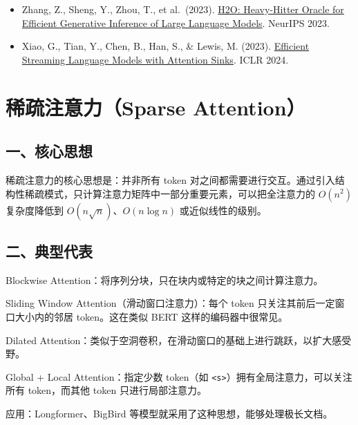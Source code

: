 \begin{itemize}
\tightlist
\item
  Zhang, Z., Sheng, Y., Zhou, T., et al.~(2023). \href{https://arxiv.org/abs/2306.14048}{H2O: Heavy-Hitter Oracle for Efficient Generative Inference of Large Language Models}. NeurIPS 2023.
\item
  Xiao, G., Tian, Y., Chen, B., Han, S., \& Lewis, M. (2023). \href{https://arxiv.org/abs/2309.17453}{Efficient Streaming Language Models with Attention Sinks}. ICLR 2024.
\end{itemize}

\clearpage

\hypertarget{ux7a00ux758fux6ce8ux610fux529bsparse-attention}{%
\section{稀疏注意力（Sparse Attention）}\label{ux7a00ux758fux6ce8ux610fux529bsparse-attention}}

\hypertarget{ux4e00ux6838ux5fc3ux601dux60f3-8}{%
\subsection{一、核心思想}\label{ux4e00ux6838ux5fc3ux601dux60f3-8}}

稀疏注意力的核心思想是：并非所有 token 对之间都需要进行交互。通过引入结构性稀疏模式，只计算注意力矩阵中一部分重要元素，可以把全注意力的 \(O(n^2)\) 复杂度降低到 \(O(n\sqrt{n})\)、\(O(n\log n)\) 或近似线性的级别。

\hypertarget{ux4e8cux5178ux578bux4ee3ux8868}{%
\subsection{二、典型代表}\label{ux4e8cux5178ux578bux4ee3ux8868}}

Blockwise Attention：将序列分块，只在块内或特定的块之间计算注意力。

Sliding Window Attention（滑动窗口注意力）：每个 token 只关注其前后一定窗口大小内的邻居 token。这在类似 BERT 这样的编码器中很常见。

Dilated Attention：类似于空洞卷积，在滑动窗口的基础上进行跳跃，以扩大感受野。

Global + Local Attention：指定少数 token（如 \texttt{\textless{}s\textgreater{}}）拥有全局注意力，可以关注所有 token，而其他 token 只进行局部注意力。

应用：Longformer、BigBird 等模型就采用了这种思想，能够处理极长文档。

